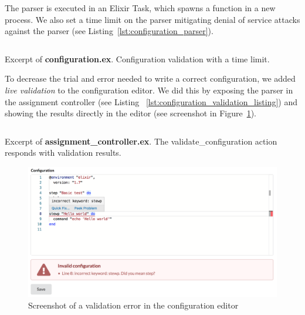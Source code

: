 The parser is executed in an Elixir Task, which spawns a function in a new process. We also set a time limit on the parser mitigating denial of service attacks against the parser (see Listing~\ref{lst:configuration_parser}).

\begin{listing}
    \inputminted[firstline=14,lastline=24]{elixir}{code/server/lib/thesis/configuration.ex}
    \caption{Excerpt of \textbf{configuration.ex}. Configuration validation with a time limit.}
    \label{lst:configuration_parser}
\end{listing}

To decrease the trial and error needed to write a correct configuration, we added \emph{live validation} to the configuration editor. We did this by exposing the parser in the assignment controller (see Listing ~\ref{lst:configuration_validation_listing}) and showing the results directly in the editor (see screenshot in Figure~\ref{fig:editor_screenshot}).

\begin{listing}
    \inputminted[firstline=29,lastline=36]{elixir}{code/server/lib/thesis_web/controllers/assignment_controller.ex}
    \caption{Excerpt of \textbf{assignment\_controller.ex}. The validate\_configuration action responds with validation results.}
    \label{lst:configuration_validation_listing}
\end{listing}

\begin{figure}
    \centering
    \includegraphics[width=\textwidth]{figure/screenshot_editor.png}
    \caption{Screenshot of a validation error in the configuration editor}
    \label{fig:editor_screenshot}
\end{figure}

